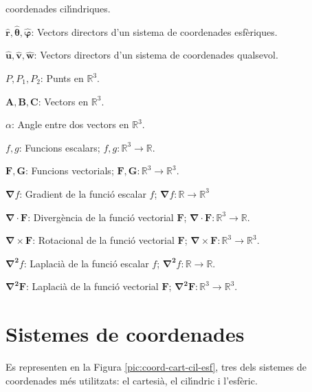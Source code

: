 \documentclass[catalan,a4paper,twoside,11pt]{article}
\begin{document}
\begin{list}{}
   coordenades cil\'{\i}ndriques.
   \item[$\boldsymbol{\hat{r}},\boldsymbol{\hat{\theta}},\boldsymbol{\hat{\varphi}}$:] Vectors directors d'un sistema de
   coordenades esf\`{e}riques.
   \item[$\boldsymbol{\hat{u}},\boldsymbol{\hat{v}},\boldsymbol{\hat{w}}$:]
   Vectors directors d'un sistema de  coordenades
   qualsevol.
   \item[$P,P_1,P_2$:] Punts en $\mathbb{R}^3$.
   \item[$\boldsymbol{A,B,C}$:] Vectors en $\mathbb{R}^3$.
   \item[$\alpha$:] Angle entre dos vectors en $\mathbb{R}^3$.
   \item[$f,g$:] Funcions escalars; $f,g: \mathbb{R}^3\rightarrow\mathbb{R}$.
   \item[$\boldsymbol{F,G}$:] Funcions vectorials; $\boldsymbol{F,G}:\mathbb{R}^3\rightarrow\mathbb{R}^3$.
   \item[$\boldsymbol{\nabla}f$:] Gradient de la funci\'{o} escalar $f$;
   $\boldsymbol{\nabla}f:\mathbb{R}\rightarrow\mathbb{R}^3$
   \item[$\boldsymbol{\nabla\cdot F}$:] Diverg\`{e}ncia de la funci\'{o} vectorial $\boldsymbol{F}$;
   $\boldsymbol{\nabla\cdot F}: \mathbb{R}^3\rightarrow\mathbb{R}$.
   \item[$\boldsymbol{\nabla\times F}$:] Rotacional de la funci\'{o} vectorial $\boldsymbol{F}$;
   $\boldsymbol{\nabla\times F}:
   \mathbb{R}^3\rightarrow\mathbb{R}^3$.
   \item[$\boldsymbol{\nabla^2}f$:] Laplaci\`{a} de la funci\'{o} escalar $f$;
   $\boldsymbol{\nabla^2}f: \mathbb{R}\rightarrow\mathbb{R}$.
   \item[$\boldsymbol{\nabla^2F}$:] Laplaci\`{a} de la funci\'{o} vectorial $\boldsymbol{F}$; $\boldsymbol{\nabla^2F}: \mathbb{R}^3\rightarrow\mathbb{R}^3$.
\end{list}

\newcommand{\va}{\ensuremath{\,\boldsymbol{\hat{\imath}}}}
\newcommand{\vb}{\ensuremath{\,\boldsymbol{\hat{\jmath}}}}
\newcommand{\vc}{\ensuremath{\,\boldsymbol{\hat{k}}}}
\section{Sistemes de coordenades}

Es representen en la Figura \vref{pic:coord-cart-cil-esf}, tres dels
sistemes de coordenades m\'{e}s utilitzats: el cartesi\`{a}, el
cil\'{\i}ndric i l'esf\`{e}ric.
\end{document}
